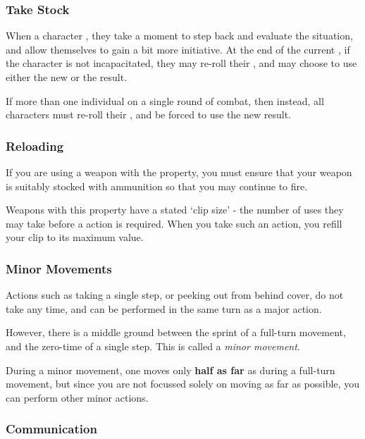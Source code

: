 \subsubsection{Take Stock}

When a character , they take a moment to step back and evaluate the situation, and allow themselves to gain a bit more initiative. At the end of the current , if the character is not incapacitated, they may re-roll their , and may choose to use either the new or the result.  

If more than one individual  on a single round of combat, then instead, all characters must re-roll their , and be forced to use the new result.

\subsubsection{Reloading}

If you are using a weapon with the  property, you must ensure that your weapon is suitably stocked with ammunition so that you may continue to fire. 

Weapons with this property have a stated `clip size' - the number of uses they may take before a  action is required. When you take such an action, you refill your clip to its maximum value.

\subsubsection{Minor Movements} 

Actions such as taking a single step, or peeking out from behind cover, do not take any time, and can be performed in the same turn as a major action. 

However, there is a middle ground between the sprint of a full-turn movement, and the zero-time of a single step. This is called a {\it minor movement}. 

During a minor movement, one moves only {\bf half as far} as during a full-turn movement, but since you are not focussed solely on moving as far as possible, you can perform other minor actions. 

\subsubsection{Communication} 

